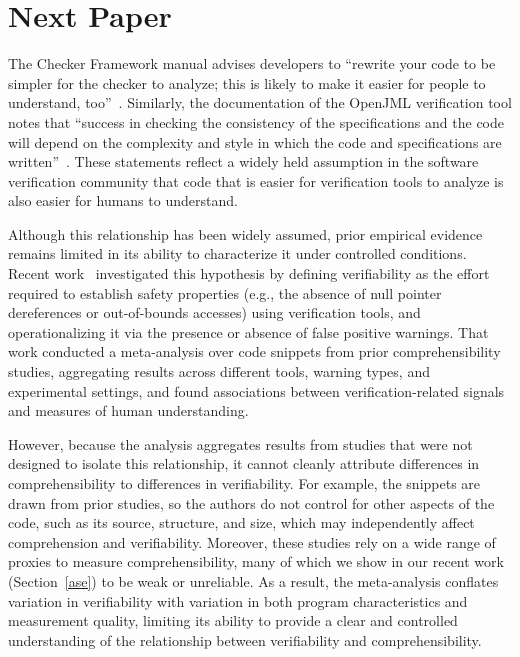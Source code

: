 \section{Next Paper}
\label{sec:nextpaper}
The Checker Framework manual advises developers to ``rewrite your code to be simpler for the checker to analyze; this is likely to make it easier for people to understand, too''~\cite{checkerframework-manual}. Similarly, the documentation of the OpenJML verification tool notes that ``success in checking the consistency of the specifications and the code will depend on the complexity and style in which the code and specifications are written''~\cite{openjml}. These statements reflect a widely held assumption in the software verification community that code that is easier for verification tools to analyze is also easier for humans to understand.

Although this relationship has been widely assumed, prior empirical evidence remains limited in its ability to characterize it under controlled conditions. Recent work~\cite{FeldmanKC2023} investigated this hypothesis by defining verifiability as the effort required to establish safety properties (e.g., the absence of null pointer dereferences or out-of-bounds accesses) using verification tools, and operationalizing it via the presence or absence of false positive warnings. That work conducted a meta-analysis over code snippets from prior comprehensibility studies, aggregating results across different tools, warning types, and experimental settings, and found associations between verification-related signals and measures of human understanding.

However, because the analysis aggregates results from studies that were not designed to isolate this relationship, it cannot cleanly attribute differences in comprehensibility to differences in verifiability. For example, the snippets are drawn from prior studies, so the authors do not control for other aspects of the code, such as its source, structure, and size, which may independently affect comprehension and verifiability. Moreover, these studies rely on a wide range of proxies to measure comprehensibility, many of which we show in our recent work (Section~\ref{ase}) to be weak or unreliable. As a result, the meta-analysis conflates variation in verifiability with variation in both program characteristics and measurement quality, limiting its ability to provide a clear and controlled understanding of the relationship between verifiability and comprehensibility.

